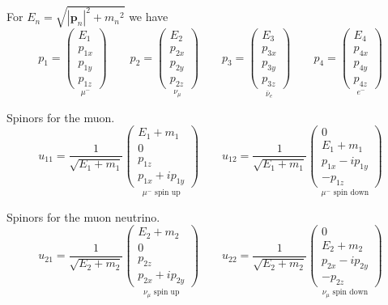 For $E_n=\sqrt{|{\mathbf p_n}|^2+{m_n}^2}$ we have
\begin{equation*}
p_1=\underset{\mu^-}
{\begin{pmatrix}E_1\\p_{1x}\\p_{1y}\\p_{1z}\end{pmatrix}}
\qquad
p_2=\underset{\nu_\mu}
{\begin{pmatrix}E_2\\p_{2x}\\p_{2y}\\p_{2z}\end{pmatrix}}
\qquad
p_3=\underset{\bar\nu_e}
{\begin{pmatrix}E_3\\p_{3x}\\p_{3y}\\p_{3z}\end{pmatrix}}
\qquad
p_4=\underset{e^-}
{\begin{pmatrix}E_4\\p_{4x}\\p_{4y}\\p_{4z}\end{pmatrix}}
\end{equation*}

Spinors for the muon.
\begin{equation*}
u_{11}=\frac{1}{\sqrt{E_1+m_1}}
\underset{\text{$\mu^-$ spin up}}
{\begin{pmatrix}E_1+m_1\\0\\p_{1z}\\p_{1x}+ip_{1y}\end{pmatrix}}
\qquad
u_{12}=\frac{1}{\sqrt{E_1+m_1}}
\underset{\text{$\mu^-$ spin down}}
{\begin{pmatrix}0\\E_1+m_1\\p_{1x}-ip_{1y}\\-p_{1z}\end{pmatrix}}
\end{equation*}

Spinors for the muon neutrino.
\begin{equation*}
u_{21}=\frac{1}{\sqrt{E_2+m_2}}
\underset{\text{$\nu_\mu$ spin up}}
{\begin{pmatrix}E_2+m_2\\0\\p_{2z}\\p_{2x}+ip_{2y}\end{pmatrix}}
\qquad
u_{22}=\frac{1}{\sqrt{E_2+m_2}}
\underset{\text{$\nu_\mu$ spin down}}
{\begin{pmatrix}0\\E_2+m_2\\p_{2x}-ip_{2y}\\-p_{2z}\end{pmatrix}}
\end{equation*}

